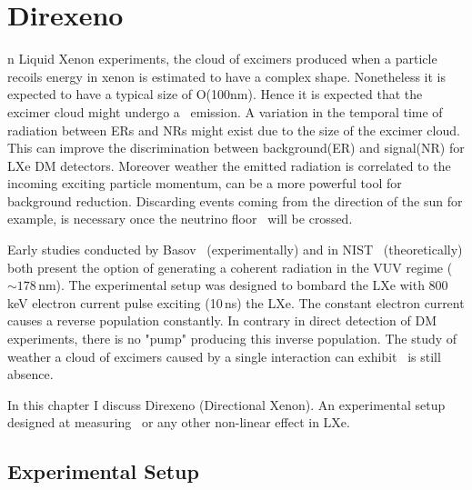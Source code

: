 %
%
\let\textcircled=\pgftextcircled
\chapter{Direxeno}
\label{chap:Direxeno}
n Liquid Xenon experiments, the cloud of excimers produced when a particle recoils energy in xenon is estimated to have a complex shape. Nonetheless it is expected to have a typical size of O(100nm). Hence it is expected that the excimer cloud might undergo a \superradiance\ emission. A variation in the temporal time of radiation between ERs and NRs might exist due to the size of the excimer cloud. This can improve the discrimination between background(ER) and signal(NR) for LXe DM detectors. Moreover weather the emitted radiation is correlated to the incoming exciting particle momentum, can be a more powerful tool for background reduction. Discarding events coming from the direction of the sun for example, is necessary once the neutrino floor~\cite{Billard:2013qya} will be crossed.  

Early studies conducted by Basov~\citep{BasovSRTheory} (experimentally) and in NIST~\cite{stim} (theoretically) both present the option of generating a coherent radiation in the VUV regime ($\sim178$\,nm). The experimental setup was designed to bombard the LXe with 800~\,keV electron current pulse exciting (10\,ns) the LXe. The constant electron current causes a reverse population constantly. In contrary in direct detection of DM experiments, there is no "pump" producing this inverse population. The study of weather a cloud of excimers caused by a single interaction can exhibit \superradiance\ is still absence.

In this chapter I discuss Direxeno (Directional Xenon). An experimental setup designed at measuring \superradiance\ or any other non-linear effect in LXe.

\section{Experimental Setup}
\label{expSetup}



